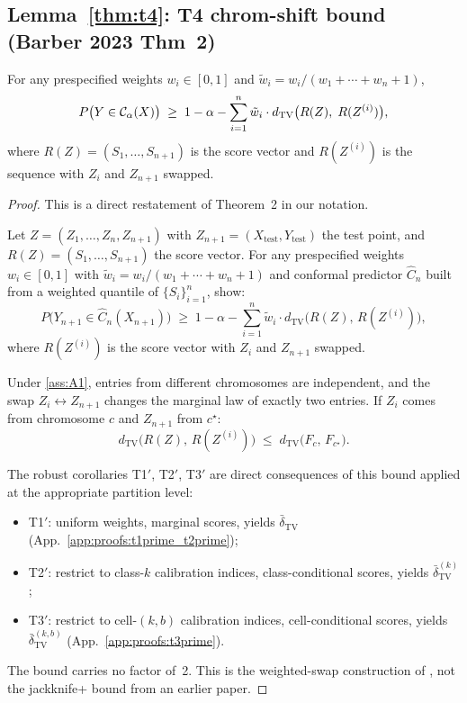 \subsection{Lemma~\ref{thm:t4}: T4 chrom-shift bound (Barber 2023 Thm~2)}
\label{app:proofs:t4}

\begin{lemma}
\label{thm:t4}
For any prespecified weights $w_i \in [0, 1]$ and $\tilde w_i = w_i / (w_1 + \cdots + w_n + 1)$,
\[
P\bigl(Y \in \mathcal{C}_\alpha(X)\bigr) \;\geq\; 1 - \alpha - \sum_{i=1}^{n} \tilde w_i \cdot d_{\mathrm{TV}}\bigl(R(Z),\; R(Z^{(i)})\bigr),
\]
where $R(Z) = (S_1, \ldots, S_{n+1})$ is the score vector and $R(Z^{(i)})$ is the sequence with $Z_i$ and $Z_{n+1}$ swapped.
\end{lemma}

\begin{proof}
This is a direct restatement of \citet{barber2023exchangeability} Theorem~2 in our notation.

Let $Z = (Z_1, \ldots, Z_n, Z_{n+1})$ with $Z_{n+1} = (X_{\mathrm{test}}, Y_{\mathrm{test}})$ the test point, and $R(Z) = (S_1, \ldots, S_{n+1})$ the score vector. For any prespecified weights $w_i \in [0, 1]$ with $\tilde w_i = w_i / (w_1 + \cdots + w_n + 1)$ and conformal predictor $\hat C_n$ built from a weighted quantile of $\{S_i\}_{i=1}^n$, \citet{barber2023exchangeability} show:
\[
P\bigl(Y_{n+1} \in \hat C_n(X_{n+1})\bigr)
\;\geq\; 1 - \alpha - \sum_{i=1}^n \tilde w_i \cdot d_{\mathrm{TV}}\bigl(R(Z),\, R(Z^{(i)})\bigr),
\]
where $R(Z^{(i)})$ is the score vector with $Z_i$ and $Z_{n+1}$ swapped.

Under \ref{ass:A1}, entries from different chromosomes are independent, and the swap $Z_i \leftrightarrow Z_{n+1}$ changes the marginal law of exactly two entries. If $Z_i$ comes from chromosome $c$ and $Z_{n+1}$ from $c^\star$:
\[
d_{\mathrm{TV}}\bigl(R(Z),\, R(Z^{(i)})\bigr) \;\leq\; d_{\mathrm{TV}}\bigl(F_c,\, F_{c^\star}\bigr).
\]

The robust corollaries T1$'$, T2$'$, T3$'$ are direct consequences of this bound applied at the appropriate partition level:
\begin{itemize}
    \item T1$'$: uniform weights, marginal scores, yields $\bar\delta_{\mathrm{TV}}$ (App.~\ref{app:proofs:t1prime_t2prime});
    \item T2$'$: restrict to class-$k$ calibration indices, class-conditional scores, yields $\bar\delta_{\mathrm{TV}}^{(k)}$;
    \item T3$'$: restrict to cell-$(k,b)$ calibration indices, cell-conditional scores, yields $\bar\delta_{\mathrm{TV}}^{(k,b)}$ (App.~\ref{app:proofs:t3prime}).
\end{itemize}
The bound carries no factor of~2. This is the weighted-swap construction of \citet{barber2023exchangeability}, not the jackknife+ bound from an earlier \citet{barber2021jackknife} paper.
\end{proof}


